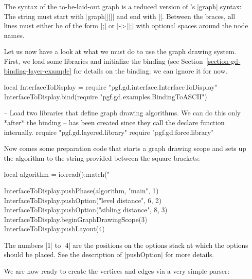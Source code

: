 The syntax of the to-be-laid-out graph is a reduced version of
\tikzname's |graph| syntax: The string must start with
|graph[||]{| and end with |}|. Between the
braces, all lines must either be of the form |;| or
|->||;| with optional spaces around the node
names.

Let us now have a look at what we must do to use the graph drawing
system. First, we load some libraries and initialize the binding (see
Section~\ref{section-gd-binding-layer-example} for details on the
binding; we can ignore it for now.

\begin{codeexample}
local InterfaceToDisplay = require "pgf.gd.interface.InterfaceToDisplay"
InterfaceToDisplay.bind(require "pgf.gd.examples.BindingToASCII")

-- Load two libraries that define graph drawing algorithms. We can do this only *after* the binding
-- has been created since they call the declare function internally.
require "pgf.gd.layered.library"
require "pgf.gd.force.library"
\end{codeexample}

Now comes some preparation code that starts a graph drawing scope and
sets up the algorithm to the string provided between the square
brackets:

\begin{codeexample}
local algorithm = io.read():match("%
  
InterfaceToDisplay.pushPhase(algorithm, "main", 1)
InterfaceToDisplay.pushOption("level distance", 6, 2)
InterfaceToDisplay.pushOption("sibling distance", 8, 3)
InterfaceToDisplay.beginGraphDrawingScope(3)
InterfaceToDisplay.pushLayout(4)
\end{codeexample}

The numbers |1| to |4| are the positions on the options stack at which
the options should be placed. See the description of |pushOption| for
more details.

We are now ready to create the vertices and edges via a very simple
parser:


